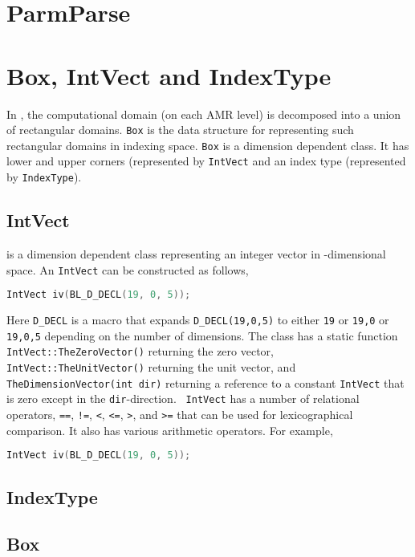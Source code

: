 \section{ParmParse}

\section{Box, IntVect and IndexType}
\label{sec:basics:box}

In \amrex, the computational domain (on each AMR level) is decomposed
into a union of rectangular domains.  {\tt Box} is the data
structure for representing such rectangular domains in indexing space.
{\tt Box} is a dimension dependent class.  It has lower and upper
corners (represented by {\tt IntVect} and an index type
(represented by {\tt IndexType}).

\subsection{IntVect}

{} is a dimension dependent class representing an
integer vector in {}-dimensional space.  An
{\tt IntVect} can be constructed as follows,
\begin{lstlisting}[language=cpp]
    IntVect iv(BL_D_DECL(19, 0, 5));
\end{lstlisting}
Here {\tt D\_DECL} is a macro that expands {\tt D\_DECL(19,0,5)} to
either {\tt 19} or {\tt 19,0} or {\tt 19,0,5} depending on the number
of dimensions.  The class has a static function {\tt
  IntVect::TheZeroVector()} returning the zero vector, {\tt
  IntVect::TheUnitVector()} returning the unit vector, and {\tt
  TheDimensionVector(int dir)} returning a reference to a constant
{\tt IntVect} that is zero except in the {\tt dir}-direction.  {\tt
  IntVect} has a number of relational operators, {\tt ==}, {\tt !=},
{\tt <}, {\tt <=}, {\tt >}, and {\tt >=} that can be used for
lexicographical comparison.  It also has various arithmetic operators.
For example,
\begin{lstlisting}[language=cpp]
    IntVect iv(BL_D_DECL(19, 0, 5));
\end{lstlisting}


\subsection{IndexType}

\subsection{Box}

